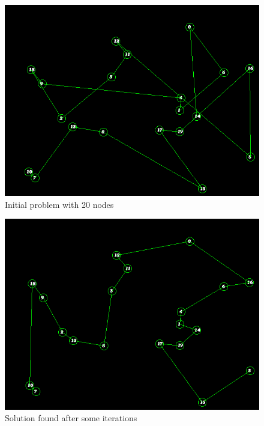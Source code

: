 \documentclass{article}
\begin{document}
    \begin{figure}
        \includegraphics[width=\linewidth]{img/init.png}
        \caption{Initial problem with 20 nodes}
        \label{fig:init}
    \end{figure}
    \begin{figure}
        \includegraphics[width=\linewidth]{img/sol.png}
        \caption{Solution found after some iterations}
        \label{fig:sol}
    \end{figure}
\end{document}
